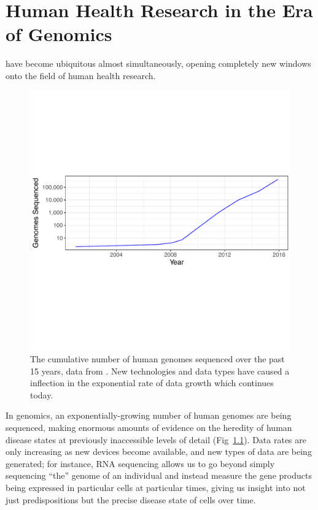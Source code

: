 \documentclass[twoside,symmetric,sfsidenotes,notoc]{tufte-book}
\begin{document}
\chapter{Human Health Research in the Era of Genomics}
\label{ch:health-data-at-scale}

 have 
become ubiquitous almost simultaneously, opening completely new windows onto the field
of human health research.  

\begin{figure}
 \includegraphics{cumulative_genomes.pdf}
  \caption[Cumulative number of human genomes sequenced]{The cumulative number of human genomes sequenced over the past 15 years,
    data from \protect\citep{stephens2015big}.  New technologies and data types have caused a inflection in the exponential rate
    of data growth which continues today.}
  \label{fig:exponential-growth}
\end{figure}

In genomics, an exponentially-growing number of human genomes are
being sequenced, making enormous amounts of evidence on the heredity
of human disease states at previously inaccessible levels of detail
(Fig~\ref{fig:exponential-growth}).  Data rates are only increasing as
new devices become available, and new types of data are being
generated; for instance, RNA sequencing allows us to go beyond
simply sequencing ``the'' genome of an individual and instead measure
the gene products being expressed in particular cells at particular
times, giving us insight into not just predispositions but the precise
disease state of cells over time.
\end{document}
